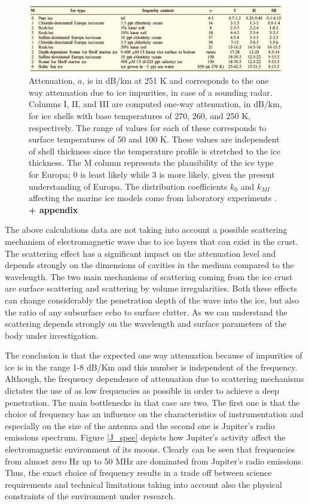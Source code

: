 {{\begin{figure}[ht]
\centering
\label{impurities}
\includegraphics[width=1\textwidth]{figures/Moore2.jpg}
\caption{Attenuation, $a$, is in dB/km at 251 K and corresponds to the one way attenuation due to  ice impurities, in case of a sounding radar. Columns I, II, and III are computed one-way attenuation, in dB/km, for ice shells with base temperatures of 270, 260, and 250 K, respectively. The range of values for each of these corresponds to surface temperatures of 50 and 100 K. These values are independent of shell thickness since the temperature profile is stretched to the ice thickness. The M column represents the plausibility of the ice type for Europa; 0 is least likely while 3 is more likely, given the present understanding
of Europa. The distribution coefficients $k_{0}$ and $k_{MI}$ affecting the marine ice models come from laboratory experiments \cite{Moore_2000}. \textbf{+ appendix}}
\end{figure}
The above calculations data are not taking into account a possible scattering mechanism of electromagnetic wave due to ice layers that can exist in the crust. The scattering effect has a significant impact on the attenuation level and depends strongly on the dimensions of cavities in the medium compared to the wavelength. The two main mechanisms of scattering coming from the ice crust are surface scattering and scattering by volume irregularities. Both these effects can change considerably the penetration depth of the wave into the ice, but also the ratio of any subsurface echo to surface clutter. As we can understand the scattering depends strongly on the wavelength and surface parameters of the body under investigation. 

The conclusion is that the expected one way attenuation because of impurities of ice is in the range 1-8 dB/Km and this number is independent of the frequency. Although, the frequency dependence of attenuation due to scattering mechanisms dictates the use of as low frequencies as possible in order to achieve a deep penetration. The main bottlenecks in that case are two. The first one is that the choice of frequency has an influence on the characteristics of instrumentation and especially on the size of the antenna and the second one is Jupiter's radio emissions spectrum. Figure \ref{J_spec} depicts how Jupiter's activity affect the electromagnetic environment of its moons. Clearly can be seen that frequencies from almost zero Hz up to 50 MHz are dominated from Jupiter's radio emissions. Thus, the exact choice of frequency results in a trade off between science requirements and technical limitations taking into account also the physical constraints of the environment under research. 

}}
